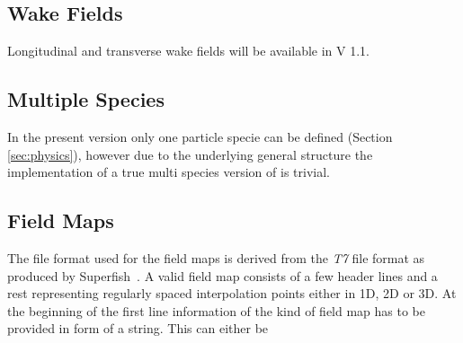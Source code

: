 \subsection{Wake Fields}
Longitudinal and transverse wake fields will be available in V 1.1.

\subsection{Multiple Species}
In the present version only one particle specie  can be defined (Section \ref{sec:physics}), however 
due to the underlying general structure the implementation of a true multi species version of \opal is 
trivial. 

\subsection{Field Maps}
\label{sec:fieldmaps}
The file format used for the field maps is derived from the  {\em T7} file format as produced by Superfish~\cite{superfish}. A valid field map consists of a few header lines and a rest representing regularly spaced interpolation points either in 1D, 2D or 3D. At the beginning of the first line information of the kind of field map has to be provided in form of a string. This can either be
